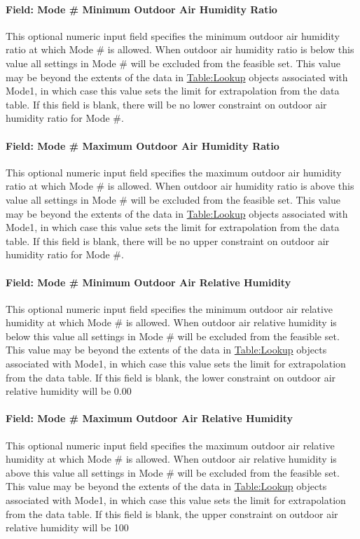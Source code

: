 \paragraph{Field: Mode \# Minimum Outdoor Air Humidity Ratio}
This optional numeric input field specifies the minimum outdoor air humidity ratio at which Mode \# is allowed. When outdoor air humidity ratio is below this value all settings in Mode \# will be excluded from the feasible set. This value may be beyond the extents of the  data in \hyperref[tablelookup]{Table:Lookup} objects associated with Mode1, in which case this value sets the limit for extrapolation from the data table. If this field is blank, there will be no lower constraint on outdoor air humidity ratio for Mode \#.

\paragraph{Field: Mode \# Maximum Outdoor Air Humidity Ratio}
This optional numeric input field specifies the maximum outdoor air humidity ratio at which Mode \# is allowed. When outdoor air humidity ratio is above this value all settings in Mode \# will be excluded from the feasible set. This value may be beyond the extents of the data in \hyperref[tablelookup]{Table:Lookup} objects associated with Mode1, in which case this value sets the limit for extrapolation from the data table. If this field is blank, there will be no upper constraint on outdoor air humidity ratio for Mode \#.

\paragraph{Field: Mode \# Minimum Outdoor Air Relative Humidity}
This optional numeric input field specifies the minimum outdoor air relative humidity at which Mode \# is allowed. When outdoor air relative humidity is below this value all settings in Mode \# will be excluded from the feasible set. This value may be beyond the extents of the data in \hyperref[tablelookup]{Table:Lookup} objects associated with Mode1, in which case this value sets the limit for extrapolation from the data table. If this field is blank, the lower constraint on outdoor air relative humidity will be 0.00%

\paragraph{Field: Mode \# Maximum Outdoor Air Relative Humidity}
This optional numeric input field specifies the maximum outdoor air relative humidity at which Mode \# is allowed. When outdoor air relative humidity is above this value all settings in Mode \# will be excluded from the feasible set. This value may be beyond the extents of the data in \hyperref[tablelookup]{Table:Lookup} objects associated with Mode1, in which case this value sets the limit for extrapolation from the data table. If this field is blank, the upper constraint on outdoor air relative humidity will be 100%


